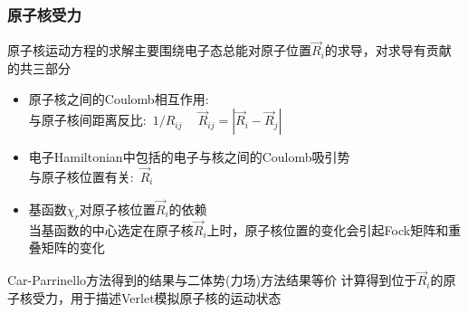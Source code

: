 %
\frame
{
	\frametitle{原子核受力}
	原子核运动方程的求解主要围绕电子态总能对原子位置$\vec R_i$的求导，对求导有贡献的共三部分
	\begin{itemize}
		\item 原子核之间的\textrm{Coulomb}相互作用:\\
			与原子核间距离反比:~$1/R_{ij}~\quad\vec R_{ij}=|\vec R_i-\vec R_j|$
		\item 电子\textrm{Hamiltonian}中包括的电子与核之间的\textrm{Coulomb}吸引势\\
			与原子核位置有关:~$\vec R_i$
		\item 基函数$\chi_r$对原子核位置$\vec R_i$的依赖\\
			当基函数的中心选定在原子核$\vec R_i$上时，原子核位置的变化会引起\textrm{Fock}矩阵和重叠矩阵的变化\\
	{\fontsize{7.2pt}{5.2pt}}
	\end{itemize}
	\textrm{Car-Parrinello}方法得到的结果与二体势(力场)方法结果等价
	\vskip 5pt
	计算得到位于$\vec R_i$的原子核受力，用于描述\textrm{Verlet}模拟原子核的运动状态
}

